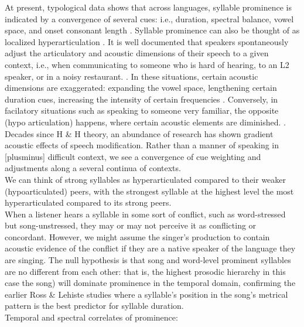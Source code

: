\documentclass[11pt]{article}
\begin{document}
 At present, typological data shows that across languages, syllable prominence is indicated by a convergence of several cues: i.e.,  duration, spectral balance, vowel space, and onset consonant length \cite{sluijterSpectralBalanceAcoustic1996,gordonPHONETICCORRELATESSTRESS1997, libermanStressLinguisticRhythm1977,berinsteinWPPNo471979,dejongStressLexicalFocus2004}.
Syllable prominence can also be thought of as localized hyperarticulation \cite{dejongSupraglottalArticulationProminence1995}. It is well documented that speakers spontaneously adjust the articulatory and acoustic dimensions of their speech to a given context, i.e., when communicating to someone who is hard of hearing, to an L2 speaker, or in a noisy restaurant. \cite{smiljanicbradlow}. In these situations, certain acoustic dimensions are exaggerated: expanding the vowel space, lengthening certain duration cues, increasing the intensity of certain frequencies \cite{}. Conversely, in facilatory situations such as speaking to someone very familiar, the opposite (hypo articulation) happens, where certain acoustic elements are diminished. \cite{lindblomExplainingPhoneticVariation1990}. Decades since H \& H theory, an abundance of research has shown gradient acoustic effects of speech modification. Rather than a manner of speaking in [plusminus] difficult context, we see a convergence of cue weighting and adjustments along a several continua of contexts.  \\
 
We can think of strong syllables as hyperarticulated compared to their weaker (hypoarticulated) peers, with the strongest syllable at the highest level the most hyperarticulated compared to its strong peers. \\

 
 

 When a listener hears a syllable in some sort of conflict, such as word-stressed but song-unstressed, they may or may not perceive it as conflicting or concordant. However, we might assume the singer's production to contain acoustic evidence of the conflict if they are a native speaker of the language they are singing. The null hypothesis is that song and word-level prominent syllables are no different from each other: that is, the highest prosodic hierarchy in this case the song) will dominate prominence in the temporal domain, confirming the earlier Ross \& Lehiste studies where a syllable's position in the song's metrical pattern is the best predictor for syllable duration.   \\
Temporal and spectral correlates of prominence: \\ 
\end{document}

